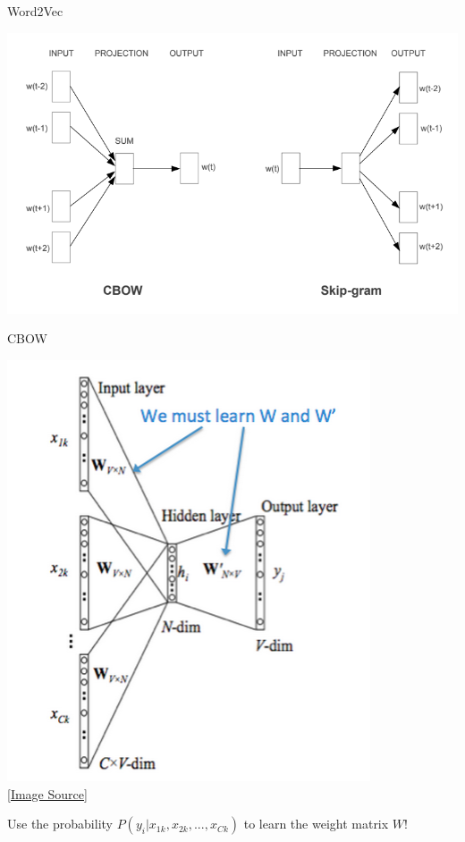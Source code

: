 \begin{frame}[fragile]{Word2Vec}

  \begin{center}
    \includegraphics[scale=0.3]{../images/img_4.png}
  \end{center}

\end{frame}

\begin{frame}[fragile]{CBOW}

  \begin{center}
    \includegraphics[scale=0.4]{../images/img_5.png} \\
    \href{https://web.stanford.edu/class/archive/cs/cs224n/cs224n.1214/readings/cs224n-2019-notes01-wordvecs1.pdf}{[Image Source]}
  \end{center}


  Use the probability $P(y_{i} | x_{1k}, x_{2k}, ... , x_{Ck})$ to learn the weight matrix $W$!
\end{frame}